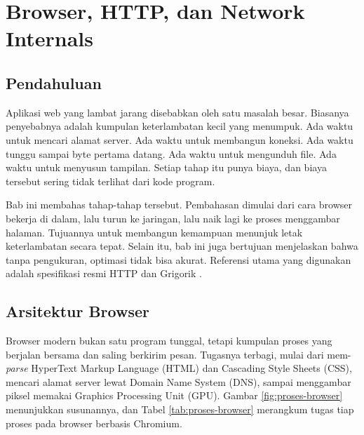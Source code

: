 \chapter{Browser, HTTP, dan Network Internals}

\section{Pendahuluan}

Aplikasi web yang lambat jarang disebabkan oleh satu masalah besar. Biasanya
penyebabnya adalah kumpulan keterlambatan kecil yang menumpuk. Ada waktu untuk
mencari alamat server. Ada waktu untuk membangun koneksi. Ada waktu tunggu
sampai byte pertama datang. Ada waktu untuk mengunduh file. Ada waktu untuk
menyusun tampilan. Setiap tahap itu punya biaya, dan biaya tersebut sering
tidak terlihat dari kode program.

Bab ini membahas tahap-tahap tersebut. Pembahasan dimulai dari cara browser
bekerja di dalam, lalu turun ke jaringan, lalu naik lagi ke proses menggambar
halaman. Tujuannya untuk membangun kemampuan menunjuk letak keterlambatan
secara tepat. Selain itu, bab ini juga bertujuan menjelaskan bahwa tanpa
pengukuran, optimasi tidak bisa akurat. Referensi utama yang digunakan adalah
spesifikasi resmi HTTP \cite{rfc9110} dan Grigorik \cite{grigorik2013hpbn}.

\section{Arsitektur Browser}

Browser modern bukan satu program tunggal, tetapi kumpulan proses yang berjalan
bersama dan saling berkirim pesan. Tugasnya terbagi, mulai dari mem-\textit{parse}
HyperText Markup Language (HTML) dan Cascading Style Sheets (CSS), mencari alamat
server lewat Domain Name System (DNS), sampai menggambar piksel memakai Graphics
Processing Unit (GPU). Gambar \ref{fig:proses-browser} menunjukkan susunannya,
dan Tabel \ref{tab:proses-browser} merangkum tugas tiap proses pada browser
berbasis Chromium.

